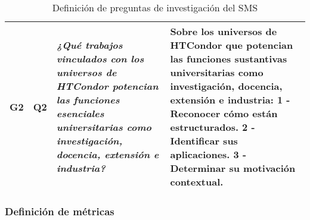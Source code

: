 \begin{table}[H]
\begin{tabular}{|>{\centering\arraybackslash}p{0.7cm}|>{\centering\arraybackslash}p{1.3cm}|p{5.5cm}|p{6cm}|}
		G2                                                                                                                                                                                                                                                                                                                                               & Q2                &
		\textit{¿Qué trabajos vinculados con los universos de HTCondor potencian las funciones esenciales universitarias como investigación, docencia, extensión e industria?}                                                                                                                                                                           &
		Sobre los universos de HTCondor que potencian las funciones sustantivas universitarias como investigación, docencia, extensión e industria: 1 - Reconocer cómo están estructurados. 2 - Identificar sus aplicaciones. 3 - Determinar su motivación contextual.                                                                                                                                                          \\ \hline
	\end{tabular}
	\caption{Definición de preguntas de investigación del SMS}
	\label{tab:preguntas}
\end{table}

\subsubsection{Definición de métricas}

